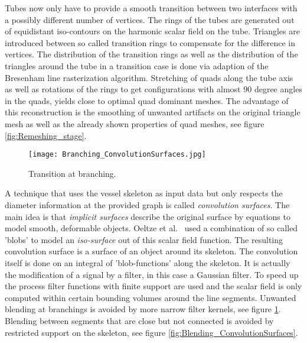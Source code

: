 Tubes now only have to provide a smooth transition between two interfaces with a possibly different number of vertices. The rings of the tubes are generated out of equidistant iso-contours on the harmonic scalar field on the tube. Triangles are introduced between so called transition rings to compensate for the difference in vertices. The distribution of the transition rings as well as the distribution of the triangles around the tube in a transition case is done via adaption of the Bresenham line rasterization algorithm. Stretching of quads along the tube axis as well as rotations of the rings to get configurations with almost $90$ degree angles in the quads, yields close to optimal quad dominant meshes. The advantage of this reconstruction is the smoothing of unwanted artifacts on the original triangle mesh as well as the already shown properties of quad meshes, see figure \ref{fig:Remeshing_stage}.


\begin{figure}[h]
	\centering
	\texttt{[image: Branching\_ConvolutionSurfaces.jpg]} \\
	\caption{Transition at branching.}
	\cite{oeltze2005visualization}
	\label{fig:Branching_ConvolutionSurfaces}
\end{figure}

A technique that uses the vessel skeleton as input data but only respects the diameter information at the provided graph is called \emph{convolution surfaces}. The main idea is that \emph{implicit surfaces} describe the original surface by equations to model smooth, deformable objects. Oeltze et al.~\cite{oeltze2005visualization} used a combination of so called 'blobs' to model an \emph{iso-surface} out of this scalar field function.
The resulting convolution surface is a surface of an object around its skeleton. The convolution itself is done on an integral of 'blob-functions' along the skeleton. It is actually the modification of a signal by a filter, in this case a Gaussian filter. To speed up the process filter functions with finite support are used and the scalar field is only computed within certain bounding volumes around the line segments. Unwanted blending at branchings is avoided by more narrow filter kernels, see figure \ref{fig:Branching_ConvolutionSurfaces}. Blending between segments that are close but not connected is avoided by restricted support on the skeleton, see figure \ref{fig:Blending_ConvolutionSurfaces}.

